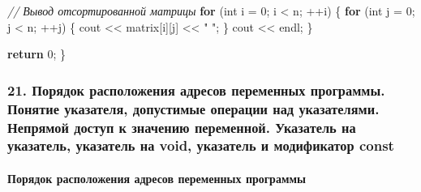 \documentclass[
]{article}
\newenvironment{Shaded}{}{}
\newcommand{\CommentTok}[1]{\textcolor[rgb]{0.38,0.63,0.69}{\textit{#1}}}
\newcommand{\ControlFlowTok}[1]{\textcolor[rgb]{0.00,0.44,0.13}{\textbf{#1}}}
\newcommand{\DataTypeTok}[1]{\textcolor[rgb]{0.56,0.13,0.00}{#1}}
\newcommand{\DecValTok}[1]{\textcolor[rgb]{0.25,0.63,0.44}{#1}}
\newcommand{\NormalTok}[1]{#1}
\newcommand{\OperatorTok}[1]{\textcolor[rgb]{0.40,0.40,0.40}{#1}}
\newcommand{\StringTok}[1]{\textcolor[rgb]{0.25,0.44,0.63}{#1}}
\begin{document}
\begin{Shaded}
\begin{Highlighting}[]
    \CommentTok{// Вывод отсортированной матрицы}
    \ControlFlowTok{for} \OperatorTok{(}\DataTypeTok{int}\NormalTok{ i }\OperatorTok{=} \DecValTok{0}\OperatorTok{;}\NormalTok{ i }\OperatorTok{\textless{}}\NormalTok{ n}\OperatorTok{;} \OperatorTok{++}\NormalTok{i}\OperatorTok{)} \OperatorTok{\{}
        \ControlFlowTok{for} \OperatorTok{(}\DataTypeTok{int}\NormalTok{ j }\OperatorTok{=} \DecValTok{0}\OperatorTok{;}\NormalTok{ j }\OperatorTok{\textless{}}\NormalTok{ n}\OperatorTok{;} \OperatorTok{++}\NormalTok{j}\OperatorTok{)} \OperatorTok{\{}
\NormalTok{            cout }\OperatorTok{\textless{}\textless{}}\NormalTok{ matrix}\OperatorTok{[}\NormalTok{i}\OperatorTok{][}\NormalTok{j}\OperatorTok{]} \OperatorTok{\textless{}\textless{}} \StringTok{" "}\OperatorTok{;}
        \OperatorTok{\}}
\NormalTok{        cout }\OperatorTok{\textless{}\textless{}}\NormalTok{ endl}\OperatorTok{;}
    \OperatorTok{\}}

    \ControlFlowTok{return} \DecValTok{0}\OperatorTok{;}
\OperatorTok{\}}
\end{Highlighting}
\end{Shaded}

\subsubsection{21. Порядок расположения адресов переменных программы.
Понятие указателя, допустимые операции над указателями. Непрямой доступ
к значению переменной. Указатель на указатель, указатель на void,
указатель и модификатор
const}\label{ux43fux43eux440ux44fux434ux43eux43a-ux440ux430ux441ux43fux43eux43bux43eux436ux435ux43dux438ux44f-ux430ux434ux440ux435ux441ux43eux432-ux43fux435ux440ux435ux43cux435ux43dux43dux44bux445-ux43fux440ux43eux433ux440ux430ux43cux43cux44b.-ux43fux43eux43dux44fux442ux438ux435-ux443ux43aux430ux437ux430ux442ux435ux43bux44f-ux434ux43eux43fux443ux441ux442ux438ux43cux44bux435-ux43eux43fux435ux440ux430ux446ux438ux438-ux43dux430ux434-ux443ux43aux430ux437ux430ux442ux435ux43bux44fux43cux438.-ux43dux435ux43fux440ux44fux43cux43eux439-ux434ux43eux441ux442ux443ux43f-ux43a-ux437ux43dux430ux447ux435ux43dux438ux44e-ux43fux435ux440ux435ux43cux435ux43dux43dux43eux439.-ux443ux43aux430ux437ux430ux442ux435ux43bux44c-ux43dux430-ux443ux43aux430ux437ux430ux442ux435ux43bux44c-ux443ux43aux430ux437ux430ux442ux435ux43bux44c-ux43dux430-void-ux443ux43aux430ux437ux430ux442ux435ux43bux44c-ux438-ux43cux43eux434ux438ux444ux438ux43aux430ux442ux43eux440-const}

\paragraph{Порядок расположения адресов переменных
программы}\label{ux43fux43eux440ux44fux434ux43eux43a-ux440ux430ux441ux43fux43eux43bux43eux436ux435ux43dux438ux44f-ux430ux434ux440ux435ux441ux43eux432-ux43fux435ux440ux435ux43cux435ux43dux43dux44bux445-ux43fux440ux43eux433ux440ux430ux43cux43cux44b}
\end{document}
